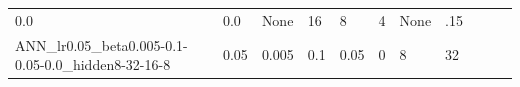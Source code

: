 \documentclass[11pt, a4paper , landscape]{article}
\begin{document}
\begin{longtable}[]{@{}lllllllllll@{}}
\begin{minipage}[t]{0.05\columnwidth}
0.0\strut
\end{minipage} & \begin{minipage}[t]{0.05\columnwidth}\raggedright\strut
0.0\strut
\end{minipage} & \begin{minipage}[t]{0.05\columnwidth}\raggedright\strut
None\strut
\end{minipage} & \begin{minipage}[t]{0.09\columnwidth}\raggedright\strut
16\strut
\end{minipage} & \begin{minipage}[t]{0.09\columnwidth}\raggedright\strut
8\strut
\end{minipage} & \begin{minipage}[t]{0.09\columnwidth}\raggedright\strut
4\strut
\end{minipage} & \begin{minipage}[t]{0.10\columnwidth}\raggedright\strut
None\strut
\end{minipage} & \begin{minipage}[t]{0.04\columnwidth}\raggedright\strut
.15\strut
\end{minipage}\tabularnewline
\begin{minipage}[t]{0.04\columnwidth}\raggedright\strut
ANN\_lr0.05\_beta0.005-0.1-0.05-0.0\_hidden8-32-16-8\strut
\end{minipage} & \begin{minipage}[t]{0.09\columnwidth}\raggedright\strut
0.05\strut
\end{minipage} & \begin{minipage}[t]{0.04\columnwidth}\raggedright\strut
0.005\strut
\end{minipage} & \begin{minipage}[t]{0.05\columnwidth}\raggedright\strut
0.1\strut
\end{minipage} & \begin{minipage}[t]{0.05\columnwidth}\raggedright\strut
0.05\strut
\end{minipage} & \begin{minipage}[t]{0.05\columnwidth}\raggedright\strut
0\strut
\end{minipage} & \begin{minipage}[t]{0.09\columnwidth}\raggedright\strut
8\strut
\end{minipage} & \begin{minipage}[t]{0.09\columnwidth}\raggedright\strut
32\strut
\end{minipage} & \begin{minipage}[t]{0.09\columnwidth}\raggedright\strut

\end{minipage}
\end{longtable}
\end{document}
